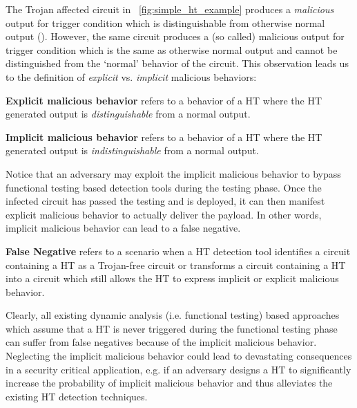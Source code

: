 \documentclass[10pt,journal,compsoc]{IEEEtran}
\begin{document}
The Trojan affected circuit in \figurename~\ref{fig:simple_ht_example} produces a \textit{malicious} output  for trigger condition  which is distinguishable from otherwise normal output (). 
However, the same circuit produces a (so called) malicious output  for trigger condition  which is the same as otherwise normal output and cannot be distinguished from the `normal' behavior of the circuit.
This observation leads us to the definition of \textit{explicit} vs. \textit{implicit} malicious behaviors:

\begin{definition}
\textbf{Explicit malicious behavior} refers to a behavior of a HT where the HT generated output is \textit{distinguishable} from a normal output.
\end{definition}
\begin{definition}
\textbf{Implicit malicious behavior} refers to a behavior of a HT where the HT generated output is \textit{indistinguishable} from a normal output. 
\end{definition}

Notice that an adversary may exploit the implicit malicious behavior to bypass functional testing based detection tools during the testing phase.
Once the infected circuit has passed the testing and is deployed, it can then manifest explicit malicious behavior to actually deliver the payload.
In other words, implicit malicious behavior can lead to a false negative.

\begin{definition}
\textbf{False Negative} refers to a scenario when a HT detection tool identifies a circuit containing a HT as a Trojan-free circuit or transforms a circuit containing a HT into a circuit which still allows the HT to express implicit or explicit malicious behavior.
\end{definition}

Clearly, all existing dynamic analysis (i.e. functional testing) based approaches which assume that a HT is never triggered during the functional testing phase can suffer from false negatives because of the implicit malicious behavior.
Neglecting the implicit malicious behavior could lead to devastating consequences in a security critical application, e.g. if an adversary designs a HT to significantly increase the probability of implicit malicious behavior and thus alleviates the existing HT detection techniques.
\end{document}
